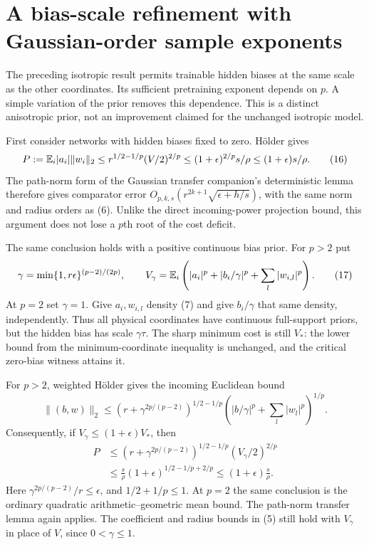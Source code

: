 \section{A bias-scale refinement with Gaussian-order sample exponents}
The preceding isotropic result permits trainable hidden biases at the
same scale as the other coordinates. Its sufficient pretraining exponent
depends on $p$. A simple variation of the prior removes this dependence.
This is a distinct anisotropic prior, not an improvement claimed for the
unchanged isotropic model.

First consider networks with hidden biases fixed to zero. H\"older gives
\[
 P:=\mathbb E_i|a_i|\|w_i\|_2
 \le r^{1/2-1/p}(V/2)^{2/p}
 \le(1+\epsilon)^{2/p}s/\rho
 \le(1+\epsilon)s/\rho.                              \tag{16}
\]
The path-norm form of the Gaussian transfer companion's deterministic
lemma therefore gives comparator error
$O_{p,k,s}(r^{2k+1}\sqrt{\epsilon+h/s})$, with the same norm and radius
orders as (6). Unlike the direct incoming-power projection bound, this
argument does not lose a $p$th root of the cost deficit.

The same conclusion holds with a positive continuous bias prior.
For $p>2$ put
\[
 \gamma=\min\{1,r\epsilon\}^{(p-2)/(2p)},
 \qquad
 V_\gamma=\mathbb E_i\left(|a_i|^p+|b_i/\gamma|^p
                                      +\sum_l|w_{i,l}|^p\right).
 \tag{17}
\]
At $p=2$ set $\gamma=1$. Give $a_i,w_{i,l}$ density (7) and give
$b_i/\gamma$ that same density, independently. Thus all physical
coordinates have continuous full-support priors, but the hidden bias
has scale $\gamma\tau$. The sharp minimum cost is still $V_*$:
the lower bound from the minimum-coordinate inequality is unchanged,
and the critical zero-bias witness attains it.

For $p>2$, weighted H\"older gives the incoming Euclidean bound
\[
 \|(b,w)\|_2\le
 \left(r+\gamma^{2p/(p-2)}\right)^{1/2-1/p}
       \left(|b/\gamma|^p+\sum_l|w_l|^p\right)^{1/p}.
\]
Consequently, if $V_\gamma\le(1+\epsilon)V_*$, then
\begin{align*}
 P&\le\left(r+\gamma^{2p/(p-2)}\right)^{1/2-1/p}
                                            (V_\gamma/2)^{2/p}\\
 &\le\frac{s}{\rho}(1+\epsilon)^{1/2-1/p+2/p}
 \le(1+\epsilon)\frac{s}{\rho}.                      \tag{18}
\end{align*}
Here $\gamma^{2p/(p-2)}/r\le\epsilon$, and
$1/2+1/p\le1$. At $p=2$ the same conclusion is the ordinary
quadratic arithmetic--geometric mean bound. The path-norm transfer
lemma again applies. The coefficient and radius bounds in (5) still
hold with $V_\gamma$ in place of $V$, since $0<\gamma\le1$.

